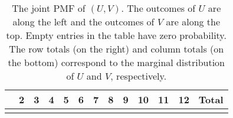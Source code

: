 \documentclass[]{book}
\numberwithin{equation}{chapter}
\numberwithin{figure}{chapter}
\theoremstyle{plain}
\theoremstyle{definition}
\theoremstyle{remark}
\theoremstyle{definition}
\theoremstyle{definition}
\theoremstyle{remark}
\begin{document}
\begin{longtable}[]{@{}lllllllllllll@{}}
\caption{The joint PMF of \((U,V)\). The outcomes of \(U\) are along the
left and the outcomes of \(V\) are along the top. Empty entries in the
table have zero probability. The row totals (on the right) and column
totals (on the bottom) correspond to the marginal distribution of \(U\)
and \(V\), respectively.}\tabularnewline
\toprule
\begin{minipage}[b]{0.02\columnwidth}\raggedright\strut
\strut
\end{minipage} & \begin{minipage}[b]{0.05\columnwidth}\raggedright\strut
2\strut
\end{minipage} & \begin{minipage}[b]{0.05\columnwidth}\raggedright\strut
3\strut
\end{minipage} & \begin{minipage}[b]{0.05\columnwidth}\raggedright\strut
4\strut
\end{minipage} & \begin{minipage}[b]{0.05\columnwidth}\raggedright\strut
5\strut
\end{minipage} & \begin{minipage}[b]{0.05\columnwidth}\raggedright\strut
6\strut
\end{minipage} & \begin{minipage}[b]{0.05\columnwidth}\raggedright\strut
7\strut
\end{minipage} & \begin{minipage}[b]{0.05\columnwidth}\raggedright\strut
8\strut
\end{minipage} & \begin{minipage}[b]{0.05\columnwidth}\raggedright\strut
9\strut
\end{minipage} & \begin{minipage}[b]{0.05\columnwidth}\raggedright\strut
10\strut
\end{minipage} & \begin{minipage}[b]{0.05\columnwidth}\raggedright\strut
11\strut
\end{minipage} & \begin{minipage}[b]{0.05\columnwidth}\raggedright\strut
12\strut
\end{minipage} & \begin{minipage}[b]{0.06\columnwidth}\raggedright\strut
Total\strut
\end{minipage}\tabularnewline
\midrule
\endfirsthead
\toprule
\begin{minipage}[b]{0.02\columnwidth}\raggedright\strut

\end{minipage}
\end{longtable}
\end{document}
